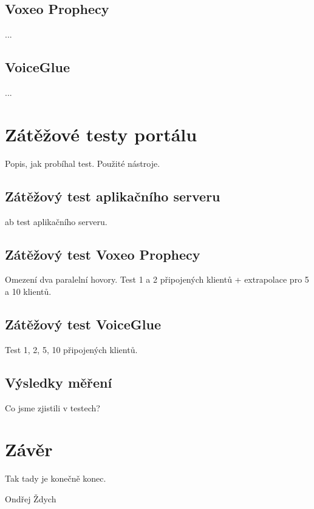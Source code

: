 \documentclass[ing,male,java,dept460]{diploma}						%
\begin{document}
\subsection{Voxeo Prophecy}
...

\subsection{VoiceGlue}
...

\section{Zátěžové testy portálu}
\label{sec:Benchmark}
Popis, jak probíhal test. Použité nástroje.

\subsection{Zátěžový test aplikačního serveru}
ab test aplikačního serveru.

\subsection{Zátěžový test Voxeo Prophecy}
Omezení dva paralelní hovory. Test 1 a 2 připojených klientů + extrapolace pro 5 a 10 klientů.

\subsection{Zátěžový test VoiceGlue}
Test 1, 2, 5, 10 připojených klientů.

\subsection{Výsledky měření}
Co jsme zjistili v testech?

\section{Závěr}
\label{sec:Conclusion}
Tak tady je konečně konec.

\bigskip
\begin{flushright}
Ondřej Ždych
\end{flushright}
\end{document}
